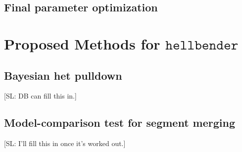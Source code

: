 \documentclass[nofootinbib,amssymb,amsmath]{revtex4}
\def\SL#1{{\color [rgb]{0,0,0.8} [SL: #1]}}
\begin{document}
\subsection{Final parameter optimization} \label{final-parameter-optimization}

\section{Proposed Methods for $\texttt{hellbender}$} \label{proposed-methods-for-texttthellbender}

\subsection{Bayesian het pulldown} \label{bayesian-het-pulldown}

\SL{DB can fill this in.}

\subsection{Model-comparison test for segment merging} \label{likelihood-based-segment-merging}

\SL{I'll fill this in once it's worked out.}
\end{document}
